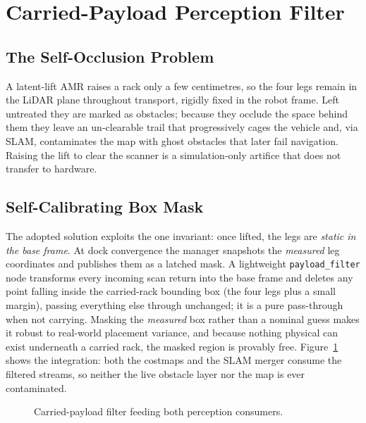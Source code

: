 \documentclass[11pt,a4paper]{article}
\newcommand{\code}[1]{\texttt{\small #1}}
\begin{document}
\section{Carried-Payload Perception Filter}\label{sec:filter}
\subsection{The Self-Occlusion Problem}
A latent-lift AMR raises a rack only a few centimetres, so the four legs
remain in the LiDAR plane throughout transport, rigidly fixed in the robot
frame. Left untreated they are marked as obstacles; because they occlude the
space behind them they leave an un-clearable trail that progressively cages
the vehicle and, via SLAM, contaminates the map with ghost obstacles that
later fail navigation. Raising the lift to clear the scanner is a
simulation-only artifice that does not transfer to hardware.

\subsection{Self-Calibrating Box Mask}
The adopted solution exploits the one invariant: once lifted, the legs are
\emph{static in the base frame}. At dock convergence the manager snapshots
the \emph{measured} leg coordinates and publishes them as a latched mask. A
lightweight \code{payload\_filter} node transforms every incoming scan return
into the base frame and deletes any point falling inside the carried-rack
bounding box (the four legs plus a small margin), passing everything else
through unchanged; it is a pure pass-through when not carrying. Masking the
\emph{measured} box rather than a nominal guess makes it robust to real-world
placement variance, and because nothing physical can exist underneath a
carried rack, the masked region is provably free.
Figure~\ref{fig:filter} shows the integration: both the costmaps and the SLAM
merger consume the filtered streams, so neither the live obstacle layer nor
the map is ever contaminated.

\begin{figure}[h]\centering
{}
\caption{Carried-payload filter feeding both perception consumers.}
\label{fig:filter}
\end{figure}
\end{document}
